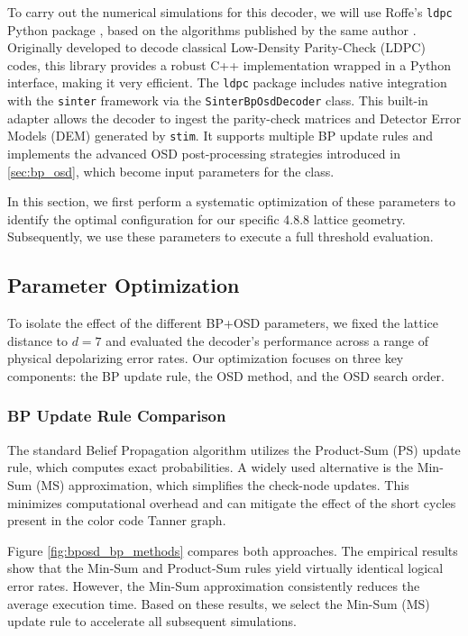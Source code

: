 To carry out the numerical simulations for this decoder, we will use Roffe's \texttt{ldpc} Python package \cite{roffe2022ldpc}, based on the algorithms published by the same author \cite{Roffe_2020}. Originally developed to decode classical Low-Density Parity-Check (LDPC) codes, this library provides a robust C++ implementation wrapped in a Python interface, making it very efficient. The \texttt{ldpc} package includes native integration with the \texttt{sinter} framework via the \texttt{SinterBpOsdDecoder} class. This built-in adapter allows the decoder to ingest the parity-check matrices and Detector Error Models (DEM) generated by \texttt{stim}. It supports multiple BP update rules and implements the advanced OSD post-processing strategies introduced in \ref{sec:bp_osd}, which become input parameters for the class.

In this section, we first perform a systematic optimization of these parameters to identify the optimal configuration for our specific 4.8.8 lattice geometry. Subsequently, we use these parameters to execute a full threshold evaluation.

\subsection{Parameter Optimization}
\label{subsec:bposd_simulation_optimization}

To isolate the effect of the different BP+OSD parameters, we fixed the lattice distance to $d=7$ and evaluated the decoder's performance across a range of physical depolarizing error rates. Our optimization focuses on three key components: the BP update rule, the OSD method, and the OSD search order.

\subsubsection{BP Update Rule Comparison}
The standard Belief Propagation algorithm utilizes the Product-Sum (PS) update rule, which computes exact probabilities. A widely used alternative is the Min-Sum (MS) approximation, which simplifies the check-node updates. This minimizes computational overhead and can mitigate the effect of the short cycles present in the color code Tanner graph.

Figure \ref{fig:bposd_bp_methods} compares both approaches. The empirical results show that the Min-Sum and Product-Sum rules yield virtually identical logical error rates. However, the Min-Sum approximation consistently reduces the average execution time. Based on these results, we select the Min-Sum (MS) update rule to accelerate all subsequent simulations.

